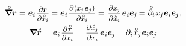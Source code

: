 \nopagebreak\vspace{-0.4em}\begin{equation*}
\begin{array}{c}
\boldnablacircled \currentlocationvector
= \bm{e}_i \hspace{.2ex} \scalebox{.9}{$ \displaystyle \frac{\raisemath{-0.2em}{\partial \currentlocationvector}}{\partial \mathcircabove{x}_i} $} \hspace{-0.1ex}
= \bm{e}_i \hspace{.2ex} \scalebox{.9}{$ \displaystyle \frac{\raisemath{-0.2em}{\partial \hspace{.1ex} ( \hspace{-0.1ex} x_{\hspace{-0.1ex}j} \hspace{.2ex} \bm{e}_j )}}{\partial \mathcircabove{x}_i} $}
=  \hspace{.2ex} \scalebox{.9}{$ \displaystyle \frac{\raisemath{-0.2em}{\partial x_{\hspace{-0.1ex}j}}}{\partial \mathcircabove{x}_i} $} \hspace{.25ex} \bm{e}_i \bm{e}_{\hspace{-0.1ex}j} \hspace{-0.2ex}
= \mathcircabove{\partial}_i \hspace{.1ex} x_{\hspace{-0.1ex}j} \hspace{.1ex} \bm{e}_i \bm{e}_{\hspace{-0.1ex}j}
\hspace{.1ex} ,
\\[.66em]
%
\boldnabla \initiallocationvector
= \bm{e}_i \hspace{.2ex} \scalebox{.9}{$ \displaystyle \frac{\raisemath{-0.2em}{\partial \hspace{.1ex} \initiallocationvector}}{\partial x_{i}} $} \hspace{-0.1ex}
= \hspace{.2ex} \scalebox{.9}{$ \displaystyle \frac{\raisemath{-0.2em}{\partial \mathcircabove{x}_{\hspace{-0.1ex}j}}}{\partial x_{i}} $} \hspace{.25ex} \bm{e}_i \bm{e}_{\hspace{-0.1ex}j} \hspace{-0.2ex}
= \partial_i \hspace{.1ex} \mathcircabove{x}_{\hspace{-0.1ex}j} \hspace{.1ex} \bm{e}_i \bm{e}_{\hspace{-0.1ex}j}
\end{array}
\end{equation*}

